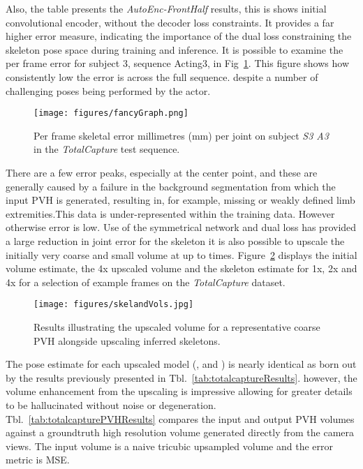 \documentclass[runningheads]{llncs}
\begin{document}
Also, the table presents the \emph{AutoEnc-FrontHalf} results, this is shows initial convolutional encoder, without the decoder loss constraints. It provides a far higher error measure, indicating the importance of the dual loss constraining the skeleton pose space during training and inference. It is possible to examine the per frame error for subject 3, sequence Acting3, in Fig~\ref{fig:TotalcaptureFramebyFrame}. This figure shows how consistently low the error is across the full sequence. despite a number of challenging poses being performed by the actor.
\begin{figure}[htb]
\centering
\texttt{[image: figures/fancyGraph.png]}
\caption{Per frame skeletal error millimetres (mm) per joint on subject {\em S3 A3} in the {\em TotalCapture} test sequence.}
\label{fig:TotalcaptureFramebyFrame}
\end{figure}
There are a few error peaks, especially at the center point, and these are generally caused by a failure in the background segmentation from which the input PVH is generated, resulting in, for example, missing or weakly defined limb extremities.This data is under-represented within the training data. However otherwise error is low. Use of the symmetrical network and dual loss has provided a large reduction in joint error for the skeleton it is also possible to upscale the initially very coarse and small volume at up to  times. Figure~\ref{fig:TCexampleAllSkels} displays the initial volume estimate, the 4x upscaled volume and the skeleton estimate for 1x, 2x and 4x for a selection of example frames on the {\em TotalCapture} dataset.
\begin{figure}[htb]
\centering
\texttt{[image: figures/skelandVols.jpg]}
\caption{Results illustrating the  upscaled volume for a representative coarse PVH alongside  upscaling inferred  skeletons.}
\label{fig:TCexampleAllSkels}
\squeezeup
\end{figure}
The pose estimate for each upscaled model (, and ) is nearly identical as born out by the results previously presented in Tbl.~\ref{tab:totalcaptureResults}. however, the volume enhancement from the  upscaling is impressive allowing for greater details to be hallucinated without noise or degeneration. Tbl.~\ref{tab:totalcapturePVHResults} compares the input and output PVH volumes against a groundtruth high resolution volume generated directly from the camera views. The input volume is a naive tricubic upsampled volume and the error metric is MSE.
\end{document}
